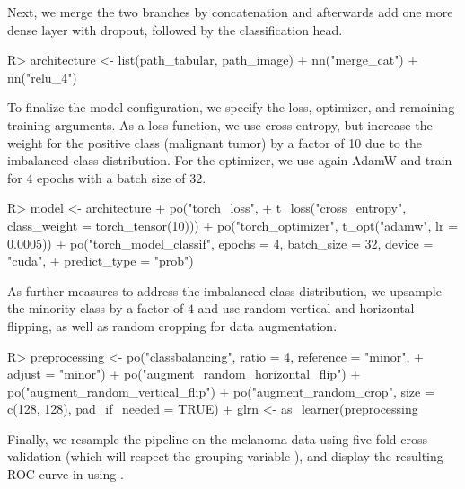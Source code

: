 \documentclass[article]{jss}
\theoremstyle{definition}
\begin{document}
Next, we merge the two branches by concatenation and afterwards add one more dense layer with dropout, followed by the classification head.

\begin{CodeInput}
R> architecture <- list(path_tabular, path_image) %
+    nn("merge_cat") %
+    nn("relu_4") %
\end{CodeInput}

To finalize the model configuration, we specify the loss, optimizer, and remaining training arguments.
As a loss function, we use cross-entropy, but increase the weight for the positive class (malignant tumor) by a factor of 10 due to the imbalanced class distribution.
For the optimizer, we use again AdamW and train for 4 epochs with a batch size of $32$.

\begin{CodeInput}
R> model <- architecture %
+    po("torch_loss",
+      t_loss("cross_entropy", class_weight = torch_tensor(10))) %
+    po("torch_optimizer", t_opt("adamw", lr = 0.0005)) %
+    po("torch_model_classif", epochs = 4, batch_size = 32, device = "cuda",
+      predict_type = "prob")
\end{CodeInput}

As further measures to address the imbalanced class distribution, we upsample the minority class by a factor of $4$ and use random vertical and horizontal flipping, as well as random cropping for data augmentation.

\begin{CodeInput}
R> preprocessing <- po("classbalancing", ratio = 4, reference = "minor",
+      adjust = "minor") %
+    po("augment_random_horizontal_flip") %
+    po("augment_random_vertical_flip") %
+    po("augment_random_crop", size = c(128, 128), pad_if_needed = TRUE)
+  glrn <- as_learner(preprocessing %
\end{CodeInput}

Finally, we resample the pipeline on the melanoma data using five-fold cross-validation (which will respect the grouping variable ), and display the resulting ROC curve in  using  \citep{ref-mlr3viz2025, ref-ggplot2}.

\end{document}

